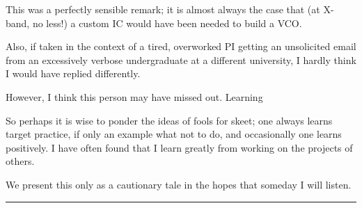 \documentclass[paper.tex]{subfiles}
\begin{document}
This was a perfectly sensible remark; it is almost always the case that (at X-band, no less!) a custom IC would have been needed to build a VCO.

Also, if taken in the context of a tired, overworked PI getting an unsolicited email from an excessively verbose undergraduate at a different university, I hardly think I would have replied differently.

However, I think this person may have missed out. Learning 

So perhaps it is wise to ponder the ideas of fools for skeet; one always learns target practice, if only an example what not to do, and occasionally one learns positively. I have often found that I learn greatly from working on the projects of others.

We present this only as a cautionary tale in the hopes that someday I will listen.

\rule{\linewidth}{0.2pt}


\end{document}
